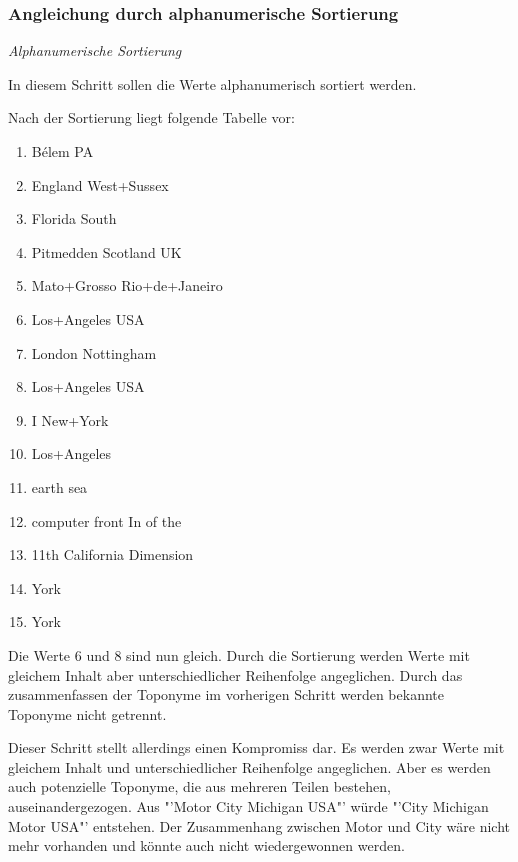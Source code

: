 			\subsubsection{Angleichung durch alphanumerische Sortierung}

				\textit{Alphanumerische Sortierung}

				In diesem Schritt sollen die Werte alphanumerisch sortiert werden. 

				Nach der Sortierung liegt folgende Tabelle vor:

				\begin{multicols}{2}
					\begin{enumerate}
						\item Bélem PA
						\item England West+Sussex
						\item Florida South
						\item Pitmedden Scotland UK
						\item Mato+Grosso Rio+de+Janeiro
						\item Los+Angeles USA
						\item London Nottingham
						\item Los+Angeles USA
						\item I New+York 
						\item Los+Angeles
						\item earth sea
						\item computer front In of the 
						\item 11th California Dimension 
						\item York
						\item York
					\end{enumerate}
				\end{multicols}

				Die Werte 6 und 8 sind nun gleich. 
				Durch die Sortierung werden Werte mit gleichem Inhalt aber unterschiedlicher Reihenfolge angeglichen.
				Durch das zusammenfassen der Toponyme im vorherigen Schritt werden bekannte Toponyme nicht getrennt.

				Dieser Schritt stellt allerdings einen Kompromiss dar.
				Es werden zwar Werte mit gleichem Inhalt und unterschiedlicher Reihenfolge angeglichen.
				Aber es werden auch potenzielle Toponyme, die aus mehreren Teilen bestehen, auseinandergezogen.
				Aus "'Motor City Michigan USA"' würde "'City Michigan Motor USA"' entstehen.
				Der Zusammenhang zwischen Motor und City wäre nicht mehr vorhanden und könnte auch nicht wiedergewonnen werden.

